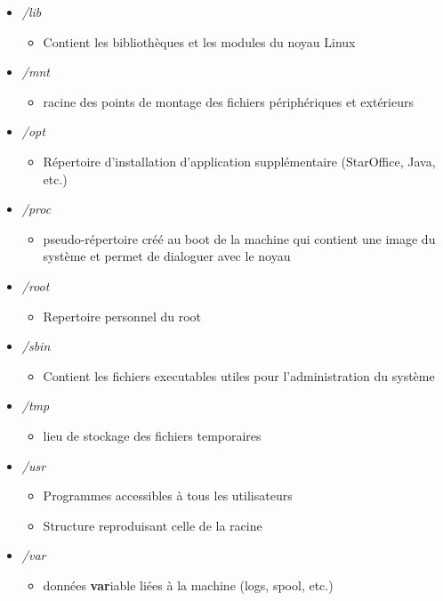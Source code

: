 \documentclass[a4paper]{article}
\begin{document}
\begin{itemize}[label=\textbullet, font=\Large]
      \item \emph{/lib}
      \begin{itemize}[label=, font=\scriptsize]
        \item Contient les bibliothèques et les modules du noyau Linux
      \end{itemize}
      \item \emph{/mnt}
      \begin{itemize}[label=, font=\scriptsize]
        \item racine des points de montage des fichiers périphériques et extérieurs
      \end{itemize}
      \item \emph{/opt}
      \begin{itemize}[label=, font=\scriptsize]
        \item Répertoire d'installation d'application supplémentaire (StarOffice, Java, etc.)
      \end{itemize}
      \item \emph{/proc}
      \begin{itemize}[label=, font=\scriptsize]
        \item pseudo-répertoire créé au boot de la machine qui contient une image du système et permet de dialoguer avec le noyau
      \end{itemize}
      \item \emph{/root}
      \begin{itemize}[label=, font=\scriptsize]
        \item Repertoire personnel du root
      \end{itemize}
      \item \emph{/sbin}
      \begin{itemize}[label=, font=\scriptsize]
        \item Contient les fichiers executables utiles pour l'administration du système
      \end{itemize}
      \item \emph{/tmp}
      \begin{itemize}[label=, font=\scriptsize]
        \item lieu de stockage des fichiers temporaires
      \end{itemize}
      \item \emph{/usr}
      \begin{itemize}[label=, font=\scriptsize]
        \item Programmes accessibles à tous les utilisateurs
        \item Structure reproduisant celle de la racine
      \end{itemize}
      \item \emph{/var}
      \begin{itemize}[label=, font=\scriptsize]
        \item données \textbf{var}iable liées à la machine (logs, spool, etc.)
      \end{itemize}
    \end{itemize}
\end{document}
